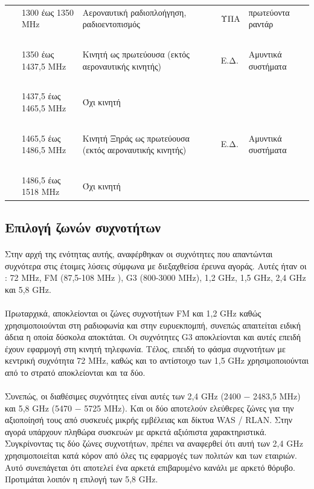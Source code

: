\documentclass[a4paper, 12pt, twoside]{report}
\begin{document}
{{{{{{\begin{landscape}
\begin{longtable} { m{3cm} m{4cm} m{4cm} m{3cm} m{5cm} }
					& 1300 έως 1350 MHz & Αεροναυτική ραδιοπλοήγηση, ραδιοεντοπισμός & ΥΠΑ & πρωτεύοντα ραντάρ\\
					\hdashline
					~\\
					& 1350 έως 1437,5 MHz & Κινητή ως πρωτεύουσα (εκτός αεροναυτικής κινητής)  & Ε.Δ. & Αμυντικά συστήματα\\
					\hdashline
					~\\
					& 1437,5 έως 1465,5 MHz & Όχι κινητή & & \\
					\hdashline
					~\\
					& 1465,5 έως 1486,5 MHz & Κινητή Ξηράς ως πρωτεύουσα (εκτός αεροναυτικής κινητής) & Ε.Δ. & Αμυντικά συστήματα\\
					\hdashline
					~\\
					& 1486,5 έως 1518 MHz & Όχι κινητή & & \\
					\hline
			\end{longtable}
			\end{landscape}
		
		\subsection{Επιλογή ζωνών συχνοτήτων}		
			
			\paragraph{}{Στην αρχή της ενότητας αυτής, αναφέρθηκαν οι συχνότητες που απαντώνται συχνότερα στις έτοιμες λύσεις σύμφωνα με διεξαχθείσα έρευνα αγοράς. Αυτές ήταν οι : 72 MHz, FM (87,5-108 MHz ), G3 (800-3000 MHz), 1,2 GHz, 1,5 GHz, 2,4 GHz και 5,8 GHz.
			}
			\paragraph{}{Πρωταρχικά, αποκλείονται οι ζώνες συχνοτήτων FM και 1,2 GHz καθώς χρησιμοποιούνται στη ραδιοφωνία και στην ευρυεκπομπή, συνεπώς απαιτείται ειδική άδεια η οποία δύσκολα αποκτάται. Οι συχνότητες G3 αποκλείονται και αυτές επειδή έχουν εφαρμογή στη κινητή τηλεφωνία. Τέλος, επειδή το φάσμα συχνοτήτων με κεντρική συχνότητα 72 MHz, καθώς και το αντίστοιχο των 1,5 GHz χρησιμοποιούνται από το στρατό αποκλείονται και τα δύο.
			}
			\paragraph{}{Συνεπώς, οι διαθέσιμες συχνότητες είναι αυτές των 2,4 GHz (2400 − 2483,5 MHz) και 5,8 GHz (5470 − 5725 ΜΗz). Και οι δύο αποτελούν ελεύθερες ζώνες για την αξιοποίησή τους από συσκευές μικρής εμβέλειας και δίκτυα WAS / RLAN. Στην αγορά υπάρχουν πληθώρα συσκευών με αρκετά αξιόπιστα χαρακτηριστικά. Συγκρίνοντας τις δύο ζώνες συχνοτήτων, πρέπει να αναφερθεί ότι αυτή των 2,4 GHz χρησιμοποιείται κατά κόρον από όλες τις εφαρμογές των πολιτών και των εταιριών. Αυτό συνεπάγεται ότι αποτελεί ένα αρκετά επιβαρυμένο κανάλι με αρκετό θόρυβο. Προτιμάται λοιπόν η επιλογή των 5,8 GHz.
			}
}}}}}}
\end{document}

